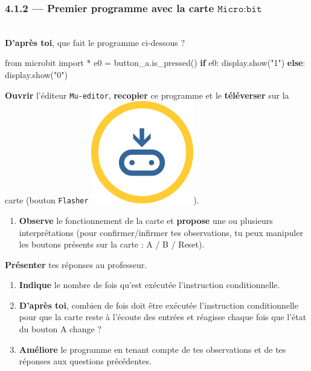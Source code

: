\documentclass[a4paper,17pt]{extarticle}
\newenvironment{eleve}%
{\begin{activite}\color{noiramu}\\[-0.5cm]}
{\end{activite}}
\providecommand{\tightlist}{%
      \setlength{\itemsep}{0pt}\setlength{\parskip}{0pt}}
\newenvironment{Shaded}{}{}
\newcommand{\StringTok}[1]{\textcolor[rgb]{0.25,0.44,0.63}{{#1}}}
\newcommand{\NormalTok}[1]{{#1}}
\newcommand{\ImportTok}[1]{{#1}}
\newcommand{\ControlFlowTok}[1]{\textcolor[rgb]{0.00,0.44,0.13}{\textbf{{#1}}}}
\newcommand{\OperatorTok}[1]{\textcolor[rgb]{0.40,0.40,0.40}{{#1}}}
\begin{document}
    \hypertarget{premier-programme-avec-la-carte-textttmicrobit}{%
\subsubsection{\texorpdfstring{4.1.2 --- Premier programme avec la carte
\(\texttt{Micro:bit}\)}{4.1.2 --- Premier programme avec la carte \textbackslash texttt\{Micro:bit\}}}\label{premier-programme-avec-la-carte-textttmicrobit}}
\begin{eleve}
    \textbf{D'après toi}, que fait le programme ci-dessous ?

\begin{Shaded}
\begin{Highlighting}[]
\ImportTok{from}\NormalTok{ microbit }\ImportTok{import} \OperatorTok{*}
\NormalTok{e0 }\OperatorTok{=}\NormalTok{ button\_a.is\_pressed()}
\ControlFlowTok{if}\NormalTok{ e0:}
\NormalTok{    display.show(}\StringTok{"1"}\NormalTok{)}
\ControlFlowTok{else}\NormalTok{:}
\NormalTok{    display.show(}\StringTok{"0"}\NormalTok{)}
\end{Highlighting}
\end{Shaded}

\textbf{Ouvrir} l'éditeur \texttt{Mu-editor}, \textbf{recopier} ce
programme et le \textbf{téléverser} sur la carte (bouton
\texttt{Flasher} \includegraphics{res/flash.png}).

\begin{enumerate}
\def\labelenumi{\arabic{enumi}.}
\setcounter{enumi}{1}
\tightlist
\item
  \textbf{Observe} le fonctionnement de la carte et \textbf{propose} une
  ou plusieurs interprétations (pour confirmer/infirmer tes
  observations, tu peux manipuler les boutons présents sur la carte : A
  / B / Reset).
\end{enumerate}

\textbf{Présenter} tes réponses au professeur.

\begin{enumerate}
\def\labelenumi{\arabic{enumi}.}
\setcounter{enumi}{2}
\tightlist
\item
  \textbf{Indique} le nombre de fois qu'est exécutée l'instruction
  conditionnelle.
\item
  \textbf{D'après toi}, combien de fois doit être exécutée l'instruction
  conditionnelle pour que la carte reste à l'écoute des entrées et
  réagisse chaque fois que l'état du bouton A change ?
\item
  \textbf{Améliore} le programme en tenant compte de tes observations et
  de tes réponses aux questions précédentes.
\end{enumerate}


\end{eleve}
\end{document}

